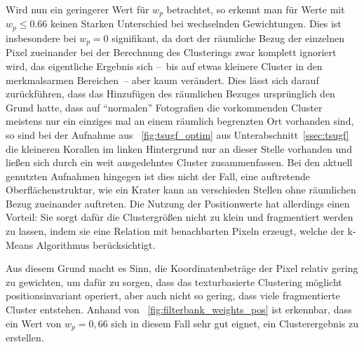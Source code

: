 Wird nun ein geringerer Wert für $w_p$ betrachtet, so erkennt man für Werte mit $w_p\leq0.66$ keinen Starken Unterschied bei wechselnden Gewichtungen. Dies ist insbesondere bei $w_p=0$ signifikant, da dort der räumliche Bezug der einzelnen Pixel zueinander bei der Berechnung des Clusterings zwar komplett ignoriert wird, das eigentliche Ergebnis sich --~bis auf etwas kleinere Cluster in den merkmalsarmen Bereichen~-- aber kaum verändert. Dies lässt sich darauf zurückführen, dass das Hinzufügen des räumlichen Bezuges ursprünglich den Grund hatte, dass auf \enquote{normalen} Fotografien die vorkommenden Cluster meistens nur ein einziges mal an einem räumlich begrenzten Ort vorhanden sind, so sind \zB bei der Aufnahme aus \figurename~\ref{fig:tsugf_optim} aus Unterabschnitt~\ref{ssec:tsugf} die kleineren Korallen im linken Hintergrund nur an dieser Stelle vorhanden und ließen sich durch ein weit ausgedehntes Cluster zusammenfassen. Bei den aktuell genutzten Aufnahmen hingegen ist dies nicht der Fall, eine auftretende Oberflächenstruktur, wie \zB ein Krater kann an verschieden Stellen ohne räumlichen Bezug zueinander auftreten.
Die Nutzung der Positionwerte hat allerdings einen Vorteil: Sie sorgt dafür die Clustergrößen nicht zu klein und fragmentiert werden zu lassen, indem sie eine Relation mit benachbarten Pixeln erzeugt, welche der k-Means Algorithmus berücksichtigt.

Aus diesem Grund macht es Sinn, die Koordinatenbeträge der Pixel relativ gering zu gewichten, um dafür zu sorgen, dass das texturbasierte Clustering möglicht positionsinvariant operiert, aber auch nicht so gering, dass viele fragmentierte Cluster entstehen. Anhand von \figurename~\ref{fig:filterbank_weights_pos} ist erkennbar, dass ein Wert von  $w_p=0,66$ sich in diesem Fall sehr gut eignet, ein Clusterergebnis zu erstellen.

